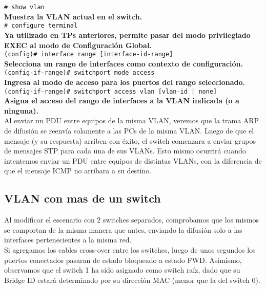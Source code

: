 \documentclass{article}
\begin{document}
\texttt{\# show vlan} \\
\textbf{Muestra la VLAN actual en el switch.} \\

\texttt{\# configure terminal} \\
\textbf{Ya utilizado en TPs anteriores, permite pasar del modo privilegiado EXEC al modo de Configuración Global.} \\

\texttt{(config)\# interface range [interface-id-range] } \\
\textbf{ Selecciona un rango de interfaces como contexto de configuración.} \\

\texttt{(config-if-range)\# switchport mode access} \\
\textbf{Ingresa al modo de acceso para los puertos del rango seleccionado.} \\

\texttt{(config-if-range)\# switchport access vlan [vlan-id | none] } \\
\textbf{ Asigna el acceso del rango de interfaces a la VLAN indicada (o a ninguna).} \\

Al enviar un PDU entre equipos de la misma VLAN, veremos que la trama ARP de difusión se reenvía solamente a las PCs de la misma VLAN. Luego de que el mensaje (y su respuesta) arriben con éxito, el switch comenzara a enviar grupos de mensajes STP para cada una de sus VLANs.
Esto mismo ocurrirá cuando intentemos enviar un PDU entre equipos de distintas VLANs, con la diferencia de que el mensaje ICMP no arribara a su destino. \\

\subsection{VLAN con mas de un switch}

Al modificar el escenario con 2 switches separados, comprobamos que los mismos se comportan de la misma manera que antes, enviando la difusión solo a las interfaces pertenecientes a la misma red. \\

Si agregamos los cables cross-over entre los switches, luego de unos segundos los puertos conectados pasaran de estado bloqueado a estado FWD. Asimismo, observamos que el switch 1 ha sido asignado como switch raíz, dado que su Bridge ID estará determinado por su dirección MAC (menor que la del switch 0). \\
\end{document}
